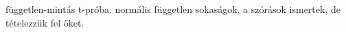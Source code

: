 független-mintás t-próba. normális független sokaságok, a szórások
 ismertek, de  tételezzük fel őket.
